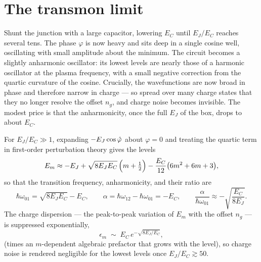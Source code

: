 \section{The transmon limit}
\label{sec:transmon-limit}

\begin{phenomenon}
Shunt the junction with a large capacitor, lowering $E_C$ until
$E_J/E_C$ reaches several tens. The phase $\varphi$ is now heavy and
sits deep in a single cosine well, oscillating with small amplitude
about the minimum. The circuit becomes a slightly anharmonic
oscillator: its lowest levels are nearly those of a harmonic oscillator
at the plasma frequency, with a small negative correction from the
quartic curvature of the cosine. Crucially, the wavefunctions are now
broad in phase and therefore narrow in charge --- so spread over many
charge states that they no longer resolve the offset $n_g$, and charge
noise becomes invisible. The modest price is that the anharmonicity,
once the full $E_J$ of the box, drops to about $E_C$.
\end{phenomenon}

\begin{statement}
\label{stmt:transmon}
For $E_J/E_C\gg1$, expanding $-E_J\cos\hat{\varphi}$ about $\varphi=0$ and
treating the quartic term in first-order perturbation theory gives the
levels
\begin{equation}
\label{eq:transmon-levels}
E_m \approx -E_J + \sqrt{8E_JE_C}\,\Bigl(m+\tfrac12\Bigr)
  - \frac{E_C}{12}\bigl(6m^2+6m+3\bigr),
\end{equation}
so that the transition frequency, anharmonicity, and their ratio are
\begin{equation}
\label{eq:transmon-freq}
\hbar\omega_{01}=\sqrt{8E_JE_C}-E_C,
\qquad
\alpha=\hbar\omega_{12}-\hbar\omega_{01}=-E_C,
\qquad
\frac{\alpha}{\hbar\omega_{01}}\approx-\sqrt{\frac{E_C}{8E_J}}.
\end{equation}
The charge dispersion --- the peak-to-peak variation of $E_m$ with the
offset $n_g$ --- is suppressed exponentially,
\begin{equation}
\label{eq:charge-dispersion}
\epsilon_m \;\sim\; E_C\,e^{-\sqrt{8E_J/E_C}},
\end{equation}
(times an $m$-dependent algebraic prefactor that grows with the level),
so charge noise is rendered negligible for the lowest levels once
$E_J/E_C\gtrsim50$.
\end{statement}

